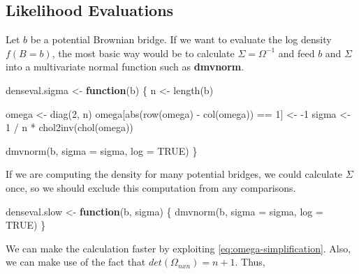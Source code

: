 \documentclass[
]{article}
\newenvironment{Shaded}{\begin{snugshade}}{\end{snugshade}}
\newcommand{\AttributeTok}[1]{\textcolor[rgb]{0.77,0.63,0.00}{#1}}
\newcommand{\ConstantTok}[1]{\textcolor[rgb]{0.00,0.00,0.00}{#1}}
\newcommand{\ControlFlowTok}[1]{\textcolor[rgb]{0.13,0.29,0.53}{\textbf{#1}}}
\newcommand{\DecValTok}[1]{\textcolor[rgb]{0.00,0.00,0.81}{#1}}
\newcommand{\FunctionTok}[1]{\textcolor[rgb]{0.00,0.00,0.00}{#1}}
\newcommand{\NormalTok}[1]{#1}
\newcommand{\OtherTok}[1]{\textcolor[rgb]{0.56,0.35,0.01}{#1}}
\newcommand{\SpecialCharTok}[1]{\textcolor[rgb]{0.00,0.00,0.00}{#1}}
\begin{document}
\hypertarget{likelihood-evaluations}{%
\subsection{Likelihood Evaluations}\label{likelihood-evaluations}}

Let \(b\) be a potential Brownian bridge. If we want to evaluate the log density \(f(B = b)\), the most basic way would be to calculate \(\Sigma = \Omega^{-1}\) and feed \(b\) and \(\Sigma\) into a multivariate normal function such as \textbf{dmvnorm}.

\begin{Shaded}
\begin{Highlighting}[]
\NormalTok{denseval.sigma }\OtherTok{\textless{}{-}} \ControlFlowTok{function}\NormalTok{(b) \{}
\NormalTok{  n }\OtherTok{\textless{}{-}} \FunctionTok{length}\NormalTok{(b)}
  
\NormalTok{  omega }\OtherTok{\textless{}{-}} \FunctionTok{diag}\NormalTok{(}\DecValTok{2}\NormalTok{, n)}
\NormalTok{  omega[}\FunctionTok{abs}\NormalTok{(}\FunctionTok{row}\NormalTok{(omega) }\SpecialCharTok{{-}} \FunctionTok{col}\NormalTok{(omega)) }\SpecialCharTok{==} \DecValTok{1}\NormalTok{] }\OtherTok{\textless{}{-}} \SpecialCharTok{{-}}\DecValTok{1}
\NormalTok{  sigma }\OtherTok{\textless{}{-}} \DecValTok{1} \SpecialCharTok{/}\NormalTok{ n }\SpecialCharTok{*} \FunctionTok{chol2inv}\NormalTok{(}\FunctionTok{chol}\NormalTok{(omega))}
  
  \FunctionTok{dmvnorm}\NormalTok{(b, }\AttributeTok{sigma =}\NormalTok{ sigma, }\AttributeTok{log =} \ConstantTok{TRUE}\NormalTok{)}
\NormalTok{\}}
\end{Highlighting}
\end{Shaded}

If we are computing the density for many potential bridges, we could calculate \(\Sigma\) once, so we should exclude this computation from any comparisons.

\begin{Shaded}
\begin{Highlighting}[]
\NormalTok{denseval.slow }\OtherTok{\textless{}{-}} \ControlFlowTok{function}\NormalTok{(b, sigma) \{}
  \FunctionTok{dmvnorm}\NormalTok{(b, }\AttributeTok{sigma =}\NormalTok{ sigma, }\AttributeTok{log =} \ConstantTok{TRUE}\NormalTok{)}
\NormalTok{\}}
\end{Highlighting}
\end{Shaded}

We can make the calculation faster by exploiting \eqref{eq:omega-simplification}. Also, we can make use of the fact that \(det(\Omega_{nxn}) = n + 1\). Thus,
\end{document}
